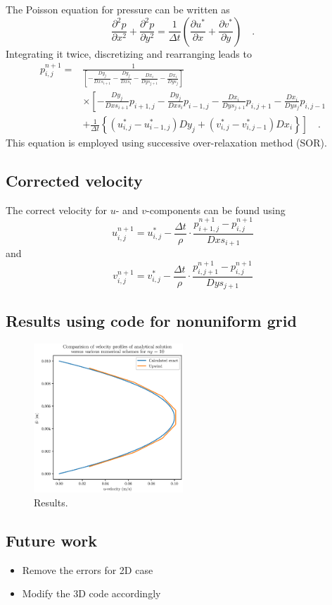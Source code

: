 \documentclass[12pt,a4paper,fleqn]{article}
\begin{document}
The Poisson equation for pressure can be written as
\begin{equation} \label{eq:poisson-components}
\frac{\partial^2 p}{\partial x^2} + \frac{\partial^2 p}{\partial y^2}
= \frac{1}{\Delta t} \left(\frac{\partial u^*}{\partial x} + \frac{\partial v^*}{\partial y}\right) \quad .
\end{equation}
Integrating it twice, discretizing and rearranging leads to
\begin{align}
p_{i,j}^{n+1} =
&\frac{1}{\left[ - \frac{Dy_j}{Dxs_{i+1}} - \frac{Dy_j}{Dxs_i} - \frac{Dx_i}{Dys_{j+1}} - \frac{Dx_i}{Dys_j} \right]}
\nonumber \\
&\times
\left[
- \frac{Dy_j}{Dxs_{i+1}}p_{i+1,j} - \frac{Dy_j}{Dxs_i}p_{i-1,j} - \frac{Dx_i}{Dys_{j+1}}p_{i,j+1} - \frac{Dx_i}{Dys_j}p_{i,j-1}
\right. \nonumber \\
&\left.
+ \frac{1}{\Delta t}\left\{
\left(u^*_{i,j}-u^*_{i-1,j}\right)Dy_j
+ \left(v^*_{i,j}-v^*_{i,j-1}\right)Dx_i
\right\}
\right]
\quad .
\end{align}
This equation is employed using successive over-relaxation method (SOR).

\subsection{Corrected velocity}
The correct velocity for $u$- and $v$-components can be found using
\begin{equation}
u^{n+1}_{i,j} = u^*_{i,j} - \frac{\Delta t}{\rho}\cdot \frac{p_{i+1,j}^{n+1} - p_{i,j}^{n+1}}{Dxs_{i+1}}
\end{equation}
and
\begin{equation}
v^{n+1}_{i,j} = v^*_{i,j} - \frac{\Delta t}{\rho}\cdot \frac{p_{i,j+1}^{n+1} - p_{i,j}^{n+1}}{Dys_{j+1}}
\end{equation}

\subsection{Results using code for nonuniform grid}

\begin{figure}[H]
    \centering
    \includegraphics[width=0.5\textwidth]{ny-10_profilesComparison.eps}
    \caption{Results.}
    \label{fig:ny-10_profilesComparison.eps}
\end{figure}

\subsection{Future work}
\begin{itemize}
\item Remove the errors for 2D case
\item Modify the 3D code accordingly
\end{itemize}
\end{document}
